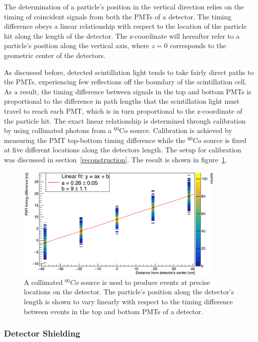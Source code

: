 The determination of a particle's position in the vertical direction relies on the timing of coincident signals from both the PMTs of a detector.
The timing difference obeys a linear relationship with respect to the location of the particle hit along the length of the detector.
The z-coordinate will hereafter refer to a particle's position along the vertical axis, where $z=0$ corresponds to the geometric center of the detectors.

As discussed before, detected scintillation light tends to take fairly direct paths to the PMTs, experiencing few reflections off the boundary of the scintillation cell.
As a result, the timing difference between signals in the top and bottom PMTs is proportional to the difference in path lengths that the scintillation light must travel to reach each PMT, which is in turn proportional to the z-coordinate of the particle hit.
The exact linear relationship is determined through calibration by using collimated photons from a $^{60}$Co source.
Calibration is achieved by measuring the PMT top-bottom timing difference while the $^{60}$Co source is fixed at five different locations along the detectors length.
The setup for calibration was discussed in section~\ref{reconstruction}.
The result is shown in figure~\ref{fig:PMTDifference}.

\begin{figure}
    \centering
    \includegraphics[width = 0.9\textwidth]{Content/Methods/PMTDifference.png}
    \caption{A collimated $^{60}Co$ source is used to produce events at precise locations on the detector.
    The particle's position along the detector's length is shown to vary linearly with respect to the timing difference between events in the top and bottom PMTs of a detector.}
    \label{fig:PMTDifference}
\end{figure}
\subsubsection{Detector Shielding}

